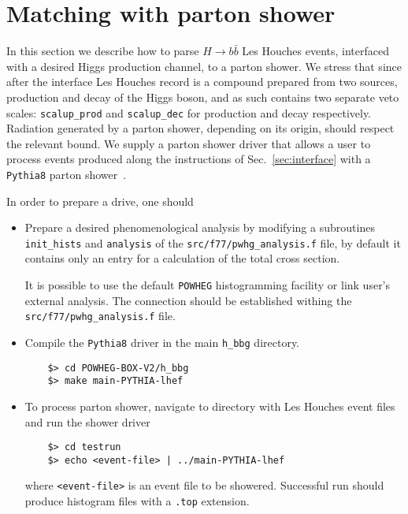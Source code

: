 \documentclass[11pt,a4paper]{article}\pdfoutput=1
\newcommand{\POWHEG}{{\tt{POWHEG}}}
\newcommand{\hbbg}{{\tt{h\_bbg}}}
\newcommand{\pythia}{{\texttt{Pythia8}}}
\newcommand{\Hbb}[1]{\ensuremath{H\to b\bar{b}{#1}}}
\begin{document}
\section{Matching with parton shower}
\label{sec:parton-shower}

In this section we describe how to parse \Hbb{} Les Houches events,
interfaced with a desired Higgs production channel, to a parton
shower.
%
We stress that since after the interface Les Houches record is a
compound prepared from two sources, production and decay of the Higgs
boson, and as such contains two separate veto scales:
\texttt{scalup\_prod} and \texttt{scalup\_dec} for production and
decay respectively.
%
Radiation generated by a parton shower, depending on its origin,
should respect the relevant bound.
%
We supply a parton shower driver that allows a user to process events
produced along the instructions of Sec.~\ref{sec:interface} with a
\pythia{} parton shower~\cite{Sjostrand:2014zea}.

In order to prepare a drive, one should
\begin{itemize}
\item Prepare a desired phenomenological analysis by modifying a
  subroutines \texttt{init\_hists} and \texttt{analysis} of the
  \texttt{src/f77/pwhg\_analysis.f} file, by default it contains only
  an entry for a calculation of the total cross section.

  It is possible to use the default \POWHEG{} histogramming facility or
  link user's external analysis. The connection should be established
  withing the \texttt{src/f77/pwhg\_analysis.f} file.
  
\item Compile the \pythia{} driver in the main \hbbg{}
  directory.
  \begin{lstlisting}
    $> cd POWHEG-BOX-V2/h_bbg
    $> make main-PYTHIA-lhef
  \end{lstlisting}
\item To process parton shower, navigate to directory with Les Houches
  event files and run the shower driver
  \begin{lstlisting}
    $> cd testrun
    $> echo <event-file> | ../main-PYTHIA-lhef
  \end{lstlisting}
  where \texttt{<event-file>} is an event file to be
  showered. Successful run should produce histogram files with a
  \texttt{.top} extension.
\end{itemize}
\end{document}
